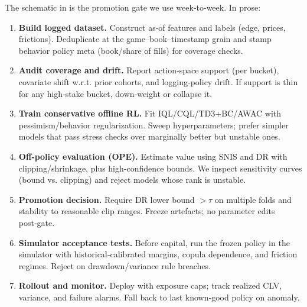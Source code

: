 The schematic in  is the promotion gate we use week‑to‑week. In prose:
\begin{enumerate}
  \item \textbf{Build logged dataset.} Construct as‑of features and labels (edge, prices, frictions). Deduplicate at the game–book–timestamp grain and stamp behavior policy meta (book/share of fills) for coverage checks.
  \item \textbf{Audit coverage and drift.} Report action‑space support (per bucket), covariate shift w.r.t. prior cohorts, and logging‑policy drift. If support is thin for any high‑stake bucket, down‑weight or collapse it.
  \item \textbf{Train conservative offline RL.} Fit IQL/CQL/TD3+BC/AWAC with pessimism/behavior regularization. Sweep hyperparameters; prefer simpler models that pass stress checks over marginally better but unstable ones.
  \item \textbf{Off‑policy evaluation (OPE).} Estimate value using SNIS and DR with clipping/shrinkage, plus high‑confidence bounds. We inspect sensitivity curves (bound vs. clipping) and reject models whose rank is unstable.
  \item \textbf{Promotion decision.} Require DR lower bound $>\tau$ on multiple folds and stability to reasonable clip ranges. Freeze artefacts; no parameter edits post‑gate.
  \item \textbf{Simulator acceptance tests.} Before capital, run the frozen policy in the simulator with historical‑calibrated margins, copula dependence, and friction regimes. Reject on drawdown/variance rule breaches.
  \item \textbf{Rollout and monitor.} Deploy with exposure caps; track realized CLV, variance, and failure alarms. Fall back to last known‑good policy on anomaly.
\end{enumerate}

